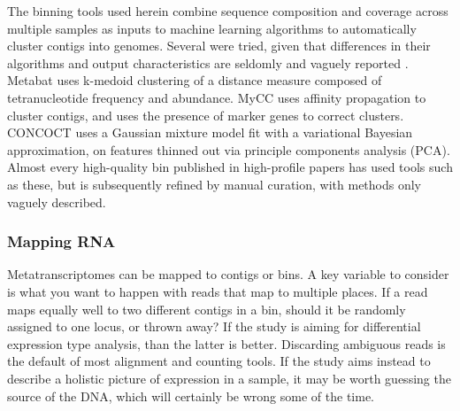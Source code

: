 The binning tools used herein combine sequence composition and coverage across multiple samples as inputs to machine learning algorithms to automatically cluster contigs into genomes.
Several were tried, given that differences in their algorithms and output characteristics are seldomly and vaguely reported \cite{sangwan2016}.
Metabat \cite{metabat2015} uses k-medoid clustering of a distance measure composed of tetranucleotide frequency and abundance.
MyCC \cite{mycc2016} uses affinity propagation to cluster contigs, and uses the presence of marker genes to correct clusters.
CONCOCT \cite{concoct2014} uses a Gaussian mixture model fit with a variational Bayesian approximation, on features thinned out via principle components analysis (PCA).
Almost every high-quality bin published in high-profile papers has used tools such as these, but is subsequently refined by manual curation, with methods only vaguely described.

\subsubsection{Mapping RNA}
Metatranscriptomes can be mapped to contigs or bins.
A key variable to consider is what you want to happen with reads that map to multiple places.
If a read maps equally well to two different contigs in a bin, should it be randomly assigned to one locus, or thrown away?
If the study is aiming for differential expression type analysis, than the latter is better.
Discarding ambiguous reads is the default of most alignment and counting tools.
If the study aims instead to describe a holistic picture of expression in a sample, it may be worth guessing the source of the DNA, which will certainly be wrong some of the time.



